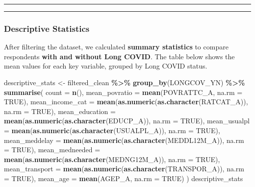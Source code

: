 \documentclass[
]{article}
\newenvironment{Shaded}{\begin{snugshade}}{\end{snugshade}}
\newcommand{\AttributeTok}[1]{\textcolor[rgb]{0.13,0.29,0.53}{#1}}
\newcommand{\ConstantTok}[1]{\textcolor[rgb]{0.56,0.35,0.01}{#1}}
\newcommand{\FunctionTok}[1]{\textcolor[rgb]{0.13,0.29,0.53}{\textbf{#1}}}
\newcommand{\NormalTok}[1]{#1}
\newcommand{\OtherTok}[1]{\textcolor[rgb]{0.56,0.35,0.01}{#1}}
\newcommand{\SpecialCharTok}[1]{\textcolor[rgb]{0.81,0.36,0.00}{\textbf{#1}}}
\begin{document}
\begin{center}\rule{0.5\linewidth}{0.5pt}\end{center}

\begin{center}\rule{0.5\linewidth}{0.5pt}\end{center}

\subsubsection{Descriptive Statistics}\label{descriptive-statistics}

After filtering the dataset, we calculated \textbf{summary statistics}
to compare respondents \textbf{with and without Long COVID}. The table
below shows the mean values for each key variable, grouped by Long COVID
status.

\begin{Shaded}
\begin{Highlighting}[]
\NormalTok{descriptive\_stats }\OtherTok{\textless{}{-}}\NormalTok{ filtered\_clean }\SpecialCharTok{\%\textgreater{}\%}
  \FunctionTok{group\_by}\NormalTok{(LONGCOV\_YN) }\SpecialCharTok{\%\textgreater{}\%}
  \FunctionTok{summarise}\NormalTok{(}
    \AttributeTok{count =} \FunctionTok{n}\NormalTok{(),}
    \AttributeTok{mean\_povratio =} \FunctionTok{mean}\NormalTok{(POVRATTC\_A, }\AttributeTok{na.rm =} \ConstantTok{TRUE}\NormalTok{),}
    \AttributeTok{mean\_income\_cat =} \FunctionTok{mean}\NormalTok{(}\FunctionTok{as.numeric}\NormalTok{(}\FunctionTok{as.character}\NormalTok{(RATCAT\_A)), }\AttributeTok{na.rm =} \ConstantTok{TRUE}\NormalTok{),}
    \AttributeTok{mean\_education =} \FunctionTok{mean}\NormalTok{(}\FunctionTok{as.numeric}\NormalTok{(}\FunctionTok{as.character}\NormalTok{(EDUCP\_A)), }\AttributeTok{na.rm =} \ConstantTok{TRUE}\NormalTok{),}
    \AttributeTok{mean\_usualpl =} \FunctionTok{mean}\NormalTok{(}\FunctionTok{as.numeric}\NormalTok{(}\FunctionTok{as.character}\NormalTok{(USUALPL\_A)), }\AttributeTok{na.rm =} \ConstantTok{TRUE}\NormalTok{),}
    \AttributeTok{mean\_meddelay =} \FunctionTok{mean}\NormalTok{(}\FunctionTok{as.numeric}\NormalTok{(}\FunctionTok{as.character}\NormalTok{(MEDDL12M\_A)), }\AttributeTok{na.rm =} \ConstantTok{TRUE}\NormalTok{),}
    \AttributeTok{mean\_medneeded =} \FunctionTok{mean}\NormalTok{(}\FunctionTok{as.numeric}\NormalTok{(}\FunctionTok{as.character}\NormalTok{(MEDNG12M\_A)), }\AttributeTok{na.rm =} \ConstantTok{TRUE}\NormalTok{),}
    \AttributeTok{mean\_transport =} \FunctionTok{mean}\NormalTok{(}\FunctionTok{as.numeric}\NormalTok{(}\FunctionTok{as.character}\NormalTok{(TRANSPOR\_A)), }\AttributeTok{na.rm =} \ConstantTok{TRUE}\NormalTok{),}
    \AttributeTok{mean\_age =} \FunctionTok{mean}\NormalTok{(AGEP\_A, }\AttributeTok{na.rm =} \ConstantTok{TRUE}\NormalTok{)}
\NormalTok{  )}
\NormalTok{descriptive\_stats}
\end{Highlighting}
\end{Shaded}
\end{document}
